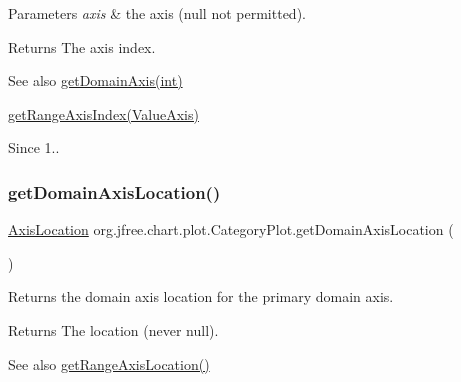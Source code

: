\begin{DoxyParams}{Parameters}
{\em axis} & the axis ({\ttfamily null} not permitted).\\
\hline
\end{DoxyParams}
\begin{DoxyReturn}{Returns}
The axis index.
\end{DoxyReturn}
\begin{DoxySeeAlso}{See also}
\mbox{\hyperlink{classorg_1_1jfree_1_1chart_1_1plot_1_1_category_plot_ab1dc3f8f848b309404d1a4ca963b11da}{get\+Domain\+Axis(int)}} 

\mbox{\hyperlink{classorg_1_1jfree_1_1chart_1_1plot_1_1_category_plot_aeaf9ec4110c7ecfb4bdddddf232e9bba}{get\+Range\+Axis\+Index(\+Value\+Axis)}}
\end{DoxySeeAlso}
\begin{DoxySince}{Since}
1.. 
\end{DoxySince}
\mbox{\label{classorg_1_1jfree_1_1chart_1_1plot_1_1_category_plot_aaf592d8e5e782d115441eaea76f88274}} 
\subsubsection{\texorpdfstring{get\+Domain\+Axis\+Location()}{getDomainAxisLocation()}\hspace{0.1cm}{\footnotesize\ttfamily [1/2]}}
{\footnotesize\ttfamily \mbox{\hyperlink{classorg_1_1jfree_1_1chart_1_1axis_1_1_axis_location}{Axis\+Location}} org.\+jfree.\+chart.\+plot.\+Category\+Plot.\+get\+Domain\+Axis\+Location (\begin{DoxyParamCaption}{ }\end{DoxyParamCaption})}

Returns the domain axis location for the primary domain axis.

\begin{DoxyReturn}{Returns}
The location (never {\ttfamily null}).
\end{DoxyReturn}
\begin{DoxySeeAlso}{See also}
\mbox{\hyperlink{classorg_1_1jfree_1_1chart_1_1plot_1_1_category_plot_ae66bc6fd3a43e9a1de43d845ecc4f919}{get\+Range\+Axis\+Location()}} 
\end{DoxySeeAlso}
\mbox{\label{classorg_1_1jfree_1_1chart_1_1plot_1_1_category_plot_a6d3f3b7805d1a24832cf40fa95a56fdc}} 
